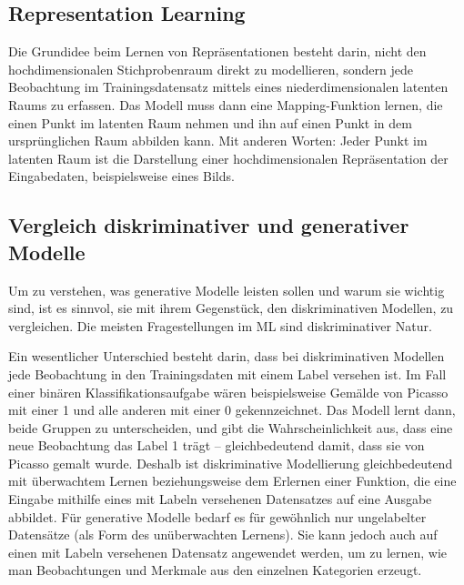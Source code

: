 \subsection{Representation Learning}\label{Representation Learning}
Die Grundidee beim Lernen von Repräsentationen besteht darin, nicht den hochdimensionalen Stichprobenraum direkt zu modellieren, sondern jede Beobachtung im Trainingsdatensatz mittels eines niederdimensionalen latenten Raums zu erfassen. Das Modell muss dann eine Mapping-Funktion lernen, die einen Punkt im latenten Raum nehmen und ihn auf einen Punkt in dem ursprünglichen Raum abbilden kann. Mit anderen Worten: Jeder Punkt im latenten Raum ist die Darstellung einer hochdimensionalen Repräsentation der Eingabedaten, beispielsweise eines Bilds.


\subsection{Vergleich diskriminativer und generativer Modelle}\label{Vergleich diskriminativer und generativer Modelle}
Um zu verstehen, was generative Modelle leisten sollen und warum sie wichtig sind, ist es sinnvol, sie mit ihrem Gegenstück, den diskriminativen Modellen, zu vergleichen. Die meisten Fragestellungen im ML sind diskriminativer Natur.

Ein wesentlicher Unterschied besteht darin, dass bei diskriminativen Modellen jede Beobachtung in den Trainingsdaten mit einem Label versehen ist. Im Fall einer binären Klassifikationsaufgabe wären beispielsweise Gemälde von Picasso mit einer 1 und alle anderen mit einer 0 gekennzeichnet. Das Modell lernt dann, beide Gruppen zu unterscheiden, und gibt die Wahrscheinlichkeit aus, dass eine neue Beobachtung das Label 1 trägt – gleichbedeutend damit, dass sie von Picasso gemalt wurde.
Deshalb ist diskriminative Modellierung gleichbedeutend mit überwachtem Lernen beziehungsweise dem Erlernen einer Funktion, die eine Eingabe mithilfe eines mit Labeln versehenen Datensatzes auf eine Ausgabe abbildet.
Für generative Modelle bedarf es für gewöhnlich nur ungelabelter Datensätze (als Form des unüberwachten Lernens). Sie kann jedoch auch auf einen mit Labeln versehenen Datensatz angewendet werden, um zu lernen, wie man Beobachtungen und Merkmale aus den einzelnen Kategorien erzeugt.


